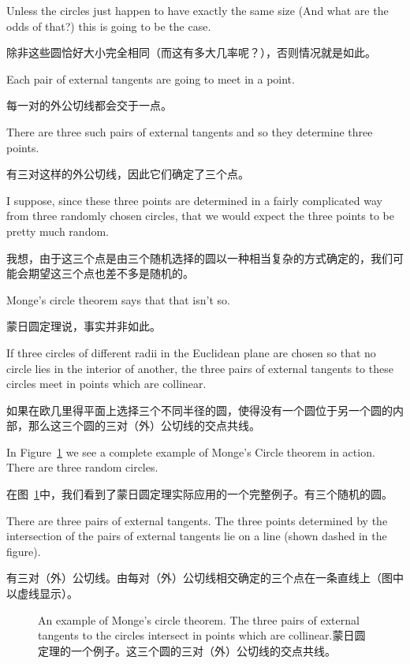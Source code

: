 Unless the circles just happen to have exactly the same size
(And what are the odds of that?) this is going to be the case.

除非这些圆恰好大小完全相同（而这有多大几率呢？），否则情况就是如此。

Each pair of external tangents are going to meet in a point.

每一对的外公切线都会交于一点。

There are three such pairs of external tangents and so they determine three points.

有三对这样的外公切线，因此它们确定了三个点。

I suppose, since these three 
points are determined in a fairly complicated way from three randomly chosen
circles, that we would expect the three points to be pretty much random.

我想，由于这三个点是由三个随机选择的圆以一种相当复杂的方式确定的，我们可能会期望这三个点也差不多是随机的。

Monge's circle theorem says that that isn't so.

蒙日圆定理说，事实并非如此。

\begin{thm} 
If three circles of different radii in the Euclidean plane are 
chosen so that no circle lies in the interior of another, the 
three pairs of external tangents to these circles meet in 
points which are collinear.
\end{thm}

\begin{thm}[蒙日圆定理]
如果在欧几里得平面上选择三个不同半径的圆，使得没有一个圆位于另一个圆的内部，那么这三个圆的三对（外）公切线的交点共线。
\end{thm}

In Figure~\ref{fig:monge2} we see a complete example of Monge's Circle theorem
in action.  There are three random circles.

在图~\ref{fig:monge2}中，我们看到了蒙日圆定理实际应用的一个完整例子。有三个随机的圆。

There are three pairs of external
tangents.  The three points determined by the intersection of the pairs of 
external tangents lie on a line (shown dashed in the figure).

有三对（外）公切线。由每对（外）公切线相交确定的三个点在一条直线上（图中以虚线显示）。

\begin{figure}[!hbtp] 
\begin{center}

\end{center}
\caption[Example of Monge's circle theorem.蒙日圆定理的例子。]{An example of Monge's %
circle theorem. The three pairs of external %
tangents to the circles intersect in points which are collinear.蒙日圆定理的一个例子。这三个圆的三对（外）公切线的交点共线。}
\label{fig:monge2}
\end{figure}
 
